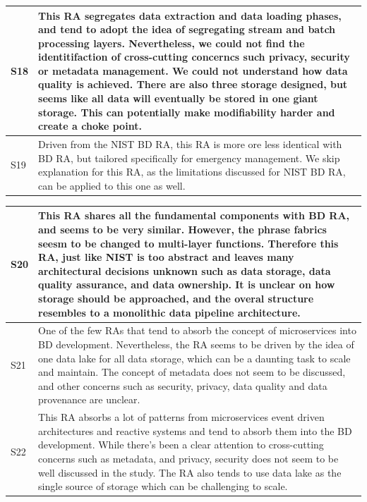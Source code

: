 \documentclass{ieeeaccess}
\begin{document}
\begin{table}
\begin{tabular}{|p{0.3cm}|p{16.8cm}|}
        \hline
        S18 & This RA segregates data extraction and data loading phases, and tend to adopt the idea of segregating stream and batch processing layers. Nevertheless, we could not find the identitifaction of cross-cutting concerncs such privacy, security or metadata management. We could not understand how data quality is achieved. There are also three storage designed, but seems like all data will eventually be stored in one giant storage. This can potentially make modifiability harder and create a choke point. \\
        \hline
        S19 & Driven from the NIST BD RA, this RA is more ore less identical with BD RA, but tailored specifically for emergency management. We skip explanation for this RA, as the limitations discussed for NIST BD RA, can be applied to this one as well. \\
        \hline
    \end{tabular}
\end{table}

\begin{table}
    \renewcommand*{\arraystretch}{1.4}
    \begin{tabular}{|p{0.3cm}|p{16.8cm}|}
        \hline
        S20 & This RA shares all the fundamental components with BD RA, and seems to be very similar. However, the phrase fabrics seesm to be changed to multi-layer functions. Therefore this RA, just like NIST is too abstract and leaves many architectural decisions unknown such as data storage, data quality assurance, and data ownership. It is unclear on how storage should be approached, and the overal structure resembles to a monolithic data pipeline architecture. \\
        \hline
        S21 & One of the few RAs that tend to absorb the concept of microservices into BD development. Nevertheless, the RA seems to be driven by the idea of one data lake for all data storage, which can be a daunting task to scale and maintain. The concept of metadata does not seem to be discussed, and other concerns such as security, privacy, data quality and data provenance are unclear.  \\
        \hline
        S22 & This RA absorbs a lot of patterns from microservices event driven architectures and reactive systems and tend to absorb them into the BD development. While there's been a clear attention to cross-cutting concerns such as metadata, and privacy, security does not seem to be well discussed in the study. The RA also tends to use data lake as the single source of storage which can be challenging to scale.  \\
        \hline
    \end{tabular}
\end{table}
\end{document}
